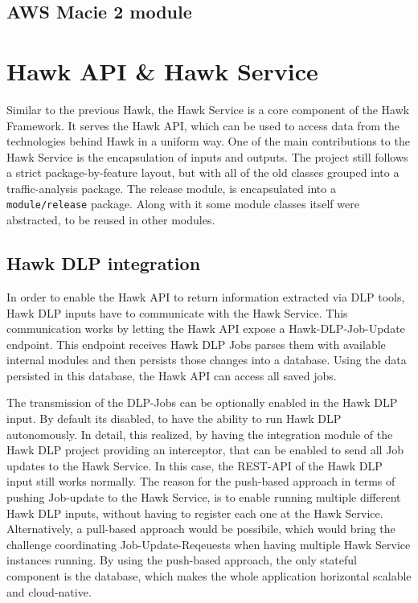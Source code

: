 \subsection{AWS Macie 2 module}



\section{Hawk API \& Hawk Service}

Similar to the previous Hawk, the Hawk Service is a core component of the Hawk Framework. It serves the Hawk API, which can be used to access data from the technologies behind Hawk in a uniform way. One of the main contributions to the Hawk Service is the encapsulation of inputs and outputs. The project still follows a strict package-by-feature layout, but with all of the old classes grouped into a traffic-analysis package. The release module, is encapsulated into a \texttt{module/release} package. Along with it some module classes itself were abstracted, to be reused in other modules.

\subsection{Hawk DLP integration}
In order to enable the Hawk API to return information extracted via DLP tools, Hawk DLP inputs have to communicate with the Hawk Service. This communication works by letting the Hawk API expose a Hawk-DLP-Job-Update endpoint. This endpoint receives Hawk DLP Jobs parses them with available internal modules and then persists those changes into a database. Using the data persisted in this database, the Hawk API can access all saved jobs.

The transmission of the DLP-Jobs can be optionally enabled in the Hawk DLP input. By default its disabled, to have the ability to run Hawk DLP autonomously. 
In detail, this realized, by having the integration module of the Hawk DLP project providing an interceptor, that can be enabled to send all Job updates to the Hawk Service. In this case, the REST-API of the Hawk DLP input still works normally. The reason for the push-based approach in terms of pushing Job-update to the Hawk Service, is to enable running multiple different Hawk DLP inputs, without having to register each one at the Hawk Service. Alternatively, a pull-based approach would be possibile, which would bring the challenge coordinating Job-Update-Reqeuests when having multiple Hawk Service instances running. By using the push-based approach, the only stateful component is the database, which makes the whole application horizontal scalable and cloud-native.

